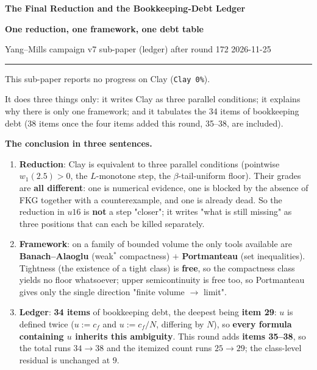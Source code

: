 \documentclass[11pt,a4paper]{article}
\newcommand{\bet}{\beta}
\begin{document}
\begin{center}
  \vspace*{0.1cm}
  {\LARGE\bfseries The Final Reduction and the Bookkeeping-Debt Ledger\par}
  \vspace{0.35em}
  {\large\bfseries One reduction, one framework, one debt table\par}
  \vspace{0.5em}
  {\small\color{black!60} Yang--Mills campaign \textperiodcentered{} v7 sub-paper (ledger)\textperiodcentered{} after round 172\textperiodcentered{} 2026-11-25\par}
  \vspace{0.35em}
  \rule{0.62\textwidth}{0.6pt}\par
  \vspace{0.4em}
  {\small\color{black!65} This sub-paper reports no progress on Clay (\texttt{Clay 0\%}).\par}
  {\small\color{black!65} It does three things only: it writes Clay as three parallel conditions; it explains why there is only one framework; and it tabulates the 34 items of bookkeeping debt (38 items once the four items added this round, 35--38, are included).\par}
\end{center}

\vspace{0.2em}

\begin{tcolorbox}[colback=black!3,colframe=black!45,boxrule=0.5pt,arc=2pt,left=6pt,right=6pt,top=5pt,bottom=5pt,breakable]
\textbf{The conclusion in three sentences.}
\begin{enumerate}[leftmargin=1.6em,itemsep=2pt,topsep=2pt]
  \item \textbf{Reduction}: Clay is equivalent to three parallel conditions (pointwise $w_1(2.5)>0$, the $L$-monotone step, the $\bet$-tail-uniform floor). Their grades are \textbf{all different}: one is numerical evidence, one is blocked by the absence of FKG together with a counterexample, and one is already dead. So the reduction in $u16$ is \textbf{not} a step "closer"; it writes "what is still missing" as three positions that can each be killed separately.
  \item \textbf{Framework}: on a family of bounded volume the only tools available are \textbf{Banach--Alaoglu} (weak$^\ast$ compactness) $+$ \textbf{Portmanteau} (set inequalities). Tightness (the existence of a tight class) is \textbf{free}, so the compactness class yields no floor whatsoever; upper semicontinuity is free too, so Portmanteau gives only the single direction "finite volume $\to$ limit".
  \item \textbf{Ledger}: \textbf{34 items} of bookkeeping debt, the deepest being \textbf{item 29}: $u$ is defined twice ($u:=c_f$ and $u:=c_f/N$, differing by $N$), so \textbf{every formula containing $u$ inherits this ambiguity}. This round adds \textbf{items 35--38}, so the total runs $34\to 38$ and the itemized count runs $25\to 29$; the class-level residual is unchanged at $9$.
\end{enumerate}
\end{tcolorbox}
\end{document}
